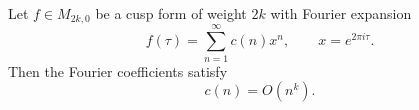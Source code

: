 Let $f \in M_{2k,0}$ be a cusp form of weight $2k$ with Fourier expansion
$$
f(\tau) = \sum_{n=1}^{\infty} c(n) x^n, \qquad x = e^{2\pi i \tau}.
$$
Then the Fourier coefficients satisfy
$$
c(n) = O(n^k).
$$
